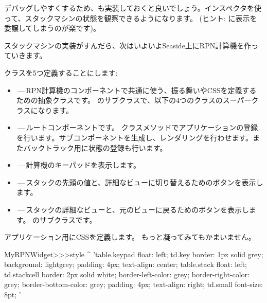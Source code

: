 \documentclass[a4paper,10pt,twoside]{book}
\begin{document}
デバッグしやすくするため、も実装しておくと良いでしょう。インスペクタを使って、スタックマシンの状態を観察できるようになります。
(ヒント:  に表示を委譲してしまうのが楽です)。


スタックマシンの実装がすんだら、次はいよいよSeaside上にRPN計算機を作っていきます。

クラスを5つ定義することにします:
\begin{itemize}
  \item {}\,---\,RPN計算機のコンポーネントで共通に使う、振る舞いやCSSを定義するための抽象クラスです。
    のサブクラスで、以下の4つのクラスのスーパークラスになります。

  \item {}\,---\,ルートコンポーネントです。
    クラスメソッドでアプリケーションの登録を行います。サブコンポーネントを生成し、レンダリングを行わせます。またバックトラック用に状態の登録も行います。
  \item {}\,---\,計算機のキーパッドを表示します。
  \item {}\,---\,スタックの先頭の値と、詳細なビューに切り替えるためのボタンを表示します。
  \item {}\,---\,スタックの詳細なビューと、元のビューに戻るためのボタンを表示します。
    のサブクラスです。
\end{itemize}


アプリケーション用にCSSを定義します。
もっと凝ってみてもかまいません。
\begin{code}{}
MyRPNWidget>>>style
	^ 'table.keypad { float: left; }
td.key {
	border: 1px solid grey;
	background: lightgrey;
	padding: 4px;
	text-align: center;
}
table.stack { float: left; }
td.stackcell {
	border: 2px solid white;
	border-left-color: grey;
	border-right-color: grey;
	border-bottom-color: grey;
	padding: 4px;
	text-align: right;
}
td.small { font-size: 8pt; }'
\end{code}
\end{document}
